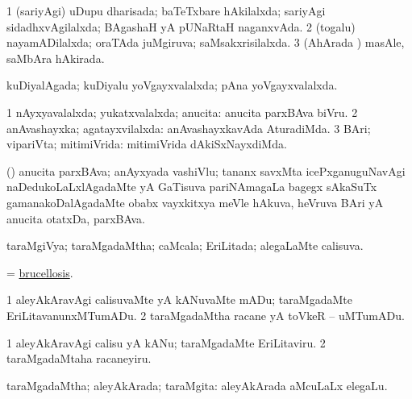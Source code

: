 \bentry
{} 
\gl{\gu}
\expl{}
\bmng
\bnum
\num{1} (sariyAgi) uDupu dharisada; baTeTxbare hAkilalxda; sariyAgi sidadhxvAgilalxda; BAgashaH yA pUNaRtaH naganxvAda. 
\num{2} (togalu) nayamADilalxda; oraTAda juMgiruva; saMsakxrisilalxda. 
\num{3} (AhArada \vi) masAle, saMbAra hAkirada. 
\enum
\emng
\eentry

\bentry
{} 
\gl{\gu}
\expl{}
\bmng
 kuDiyalAgada; kuDiyalu yoVgayxvalalxda; pAna yoVgayxvalalxda. 
\emng
\eentry

\bentry
{}
\gl{\saMkiSx}
\expl{}
\bmng
\emng
\eentry

\bentry
{} 
\gl{\gu}
\expl{}
\bmng
\bnum
\num{1} nAyxyavalalxda; yukatxvalalxda; anucita:  anucita parxBAva biVru. 
\num{2} anAvashayxka; agatayxvilalxda:  anAvashayxkavAda AturadiMda. 
\num{3} BAri; vipariVta; mitimiVrida:  mitimiVrida dAkiSxNayxdiMda. 
\enum
\emng
\eentry

\bentry
{}
\gl{\nA}
\expl{}
\bmng
 (\nAyxshA) anucita parxBAva; anAyxyada vashiVlu; tananx savxMta icePxganuguNavAgi naDedukoLaLxlAgadaMte yA GaTisuva pariNAmagaLa bagegx sAkaSuTx gamanakoDalAgadaMte obabx vayxkitxya meVle hAkuva, heVruva BAri yA anucita otatxDa, parxBAva. 
\emng
\eentry

\bentry
{} 
\gl{\gu}
\expl{}
\bmng
 taraMgiVya; taraMgadaMtha; caMcala; EriLitada; alegaLaMte calisuva. 
\emng
\eentry

\bentry
{}
\gl{\nA}
\expl{}
\bmng
 = \hyperref{kandict_b.pdf}{B}{brucellosis}{brucellosis}. 
\emng
\eentry

\bentry
{} 
\gl{\sakirx}
\expl{}
\bmng
\bnum
\num{1} aleyAkAravAgi calisuvaMte yA kANuvaMte mADu; taraMgadaMte EriLitavanunxMTumADu. 
\num{2} taraMgadaMtha racane yA toVkeR -- uMTumADu. 
\enum
\emng

\noindent
\gl{\akirx}
\expl{}
\bmng
\bnum
\num{1} aleyAkAravAgi calisu yA kANu; taraMgadaMte EriLitaviru. 
\num{2} taraMgadaMtaha racaneyiru. 
\enum
\emng
\eentry

\bentry
{} 
\gl{\gu}
\expl{}
\bmng
 taraMgadaMtha; aleyAkArada; taraMgita:  aleyAkArada aMcuLaLx elegaLu. 
\emng
\eentry

